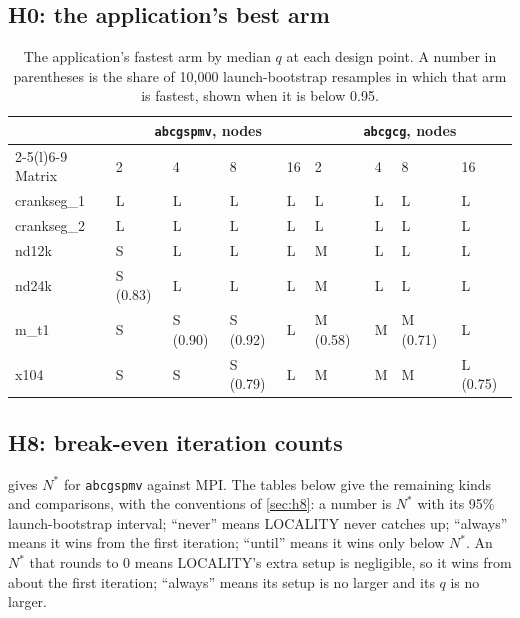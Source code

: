 \documentclass[11pt]{article}
\newcommand{\spmv}{\texttt{abcgspmv}}
\newcommand{\cg}{\texttt{abcgcg}}
\begin{document}
\begin{longtable}{@{}rllp{2.9cm}p{2.9cm}p{2.9cm}@{}}
\bottomrule
\end{longtable}
\normalsize


\subsection{H0: the application's best arm}

\begin{table}[H]
\centering
\small
\caption{The application's fastest arm by median $q$ at each design point. A number in
parentheses is the share of 10,000 launch-bootstrap resamples in which that arm is
fastest, shown when it is below 0.95.}
\label{tab:app:h0}
\begin{tabular}{@{}lllllllll@{}}
\toprule
& \multicolumn{4}{c}{\spmv, nodes} & \multicolumn{4}{c}{\cg, nodes} \\
\cmidrule(lr){2-5}\cmidrule(l){6-9}
Matrix & 2 & 4 & 8 & 16 & 2 & 4 & 8 & 16 \\
\midrule
crankseg\_1 & L & L & L & L & L & L & L & L \\
crankseg\_2 & L & L & L & L & L & L & L & L \\
nd12k & S & L & L & L & M & L & L & L \\
nd24k & S (0.83) & L & L & L & M & L & L & L \\
m\_t1 & S & S (0.90) & S (0.92) & L & M (0.58) & M & M (0.71) & L \\
x104 & S & S & S (0.79) & L & M & M & M & L (0.75) \\
\bottomrule
\end{tabular}
\end{table}


\subsection{H8: break-even iteration counts}

 gives $N^*$ for \spmv{} against MPI. The tables below give the
remaining kinds and comparisons, with the conventions of \cref{sec:h8}: a number is $N^*$
with its 95\% launch-bootstrap interval; ``never'' means LOCALITY never catches up;
``always'' means it wins from the first iteration; ``until'' means it wins only below
$N^*$. An $N^*$ that rounds to 0 means LOCALITY's extra setup is negligible, so it wins
from about the first iteration; ``always'' means its setup is no larger and its $q$ is
no larger.
\end{document}
